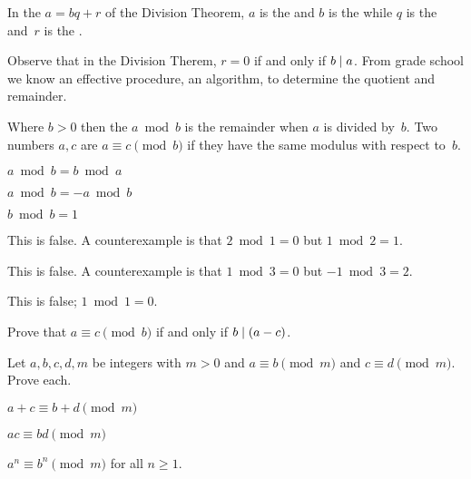 \documentclass{ibl}
\begin{document}
\begin{df}
In the  $a=bq+r$ of the Division Theorem, 
$a$ is the  and
$b$ is the  while 
$q$ is the  and~$r$ is the .  
\end{df}

Observe that in the Division Therem, $r=0$ if and only if $b\mid a$. 
From grade school we know an effective procedure, an algorithm, to 
determine the quotient and remainder.

\begin{df}
Where $b>0$ then the  $a\bmod b$ 
is the remainder when $a$ is divided by~$b$.
Two numbers $a,c$ are  $a\equiv c\pmod b$ 
if they have the same modulus with respect to~$b$.
\end{df}

\begin{ex}\pord
\begin{exes}
\item $a\bmod b=b\bmod a$
\item $a\bmod b=-a\bmod b$
\item $b\bmod b=1$    
\end{exes}
\begin{ans}
\begin{exes}
\item This is false.
  A counterexample is that $2\bmod 1=0$ but $1\bmod 2=1$.
\item This is false.
  A counterexample is that $1\bmod 3=0$ but $-1\bmod 3=2$.
\item This is false;
  $1\bmod 1=0$.     
\end{exes}
\end{ans}
\end{ex}

\begin{ex}
Prove that $a\equiv c\pmod b$ if and only if $b\mid (a-c)$.  
\end{ex}

\begin{ex}
Let $a,b,c,d,m$ be integers with $m>0$ and
$a\equiv b\pmod m$ and $c\equiv d\pmod m$.
Prove each.
\begin{exes}
\item $a+c\equiv b+d\pmod m$
\item $ac\equiv bd\pmod m$
\item $a^n\equiv b^n\pmod m$ for all $n\geq 1$.    
\end{exes}
\end{ex}
\end{document}
